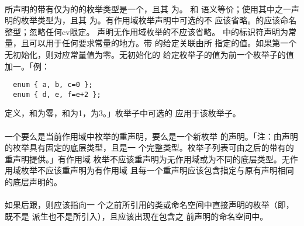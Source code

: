 \paragraph{}
所声明的带有仅为的的枚举类型是一个，且其
为。 和
语义等价；使用其中之一声明的枚举类型为，且其
为。有作用域枚举声明中可选的不
应该省略。的应该命名整型；忽略任何cv限定。
声明无作用域枚举的不应该省略。
中的标识符声明为常量，且可以用于任何要求常量的地方。带\tm{=}
的给定关联由所
指定的值。如果第一个无初始化，则对应常量值为零。无初始化的
给定枚举子的值为前一个枚举子的值加一。「例：
\begin{lstlisting}
  enum { a, b, c=0 };
  enum { d, e, f=e+2 };
\end{lstlisting}
定义，和为零，和为1，为3。」枚举子中可选的
应用于该枚举子。

\paragraph{}
一个要么是当前作用域中枚举的重声明，要么是一个新枚举
的声明。「注：由声明的枚举具有固定的底层类型，且是一
个完整类型。枚举子列表可由之后的带有的重声明提供。」有作用域
枚举不应该重声明为无作用域或为不同的底层类型。无作用域枚举不应该重声明为有作用域
且每一个重声明应该包含指定与原有声明相同的底层声明的。

\paragraph{}
如果后跟，则应该指向一
个之前所引用的类或命名空间中直接声明的枚举（即，既不是
派生也不是所引入），且应该出现在包含之
前声明的命名空间中。


